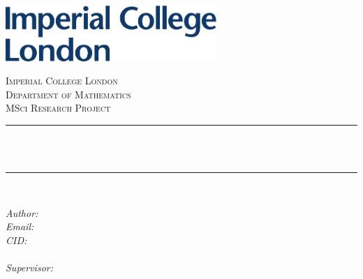 \begin{titlepage}

\newcommand{\HRule}{\rule{\linewidth}{0.5mm}} %


\includegraphics[width=8cm]{title/logo.pdf}
\vspace{40pt}
 

\center %


\textsc{\LARGE Imperial College London}\\[0.5cm] %
\textsc{\Large Department of Mathematics}\\[1.5cm] %
\textsc{\Large MSci Research Project}\\[0.5cm] %

\makeatletter
\HRule \\[0.6cm]
{ \huge \bfseries \reporttitle}\\[0.6cm] %
\HRule \\[1.5cm]
 

\begin{minipage}{0.4\textwidth}
\begin{center} \large
\emph{Author:} \reportauthor \\
\emph{Email:} \email\\
\emph{CID:} \CID \\
\vspace{0.5em}
\hrulefill \\
\vspace{0.5em}
\emph{Supervisor:} \supervisor
\end{center}
\end{minipage}
~
\makeatother


\end{titlepage}
